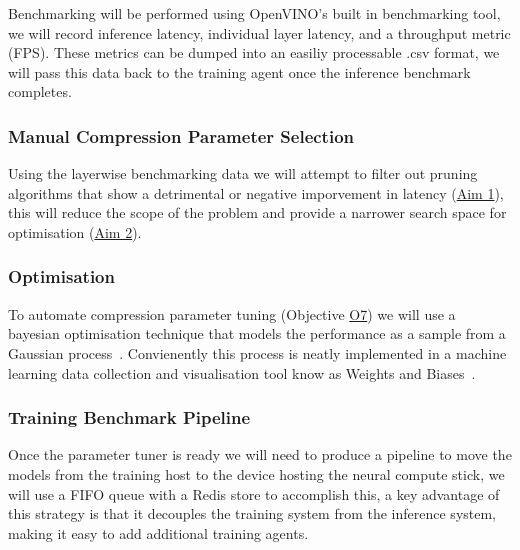 \documentclass[../D1.tex]{subfiles}
\begin{document}
Benchmarking will be performed using OpenVINO's built in benchmarking tool, we will record inference latency, individual layer latency, and a throughput metric (FPS). 
These metrics can be dumped into an easiliy processable .csv format, we will pass this data back to the training agent once the inference benchmark completes.


\subsubsection{Manual Compression Parameter Selection}
Using the layerwise benchmarking data we will attempt to filter out pruning algorithms that show a detrimental or negative imporvement in latency (\hyperref[Aim1]{Aim 1}), this will reduce the scope of the problem and provide a narrower search space for optimisation (\hyperref[Aim2]{Aim 2}).

\subsubsection{Optimisation}
To automate compression parameter tuning (Objective \hyperref[obj:CompPara]{O7}) we will use a bayesian optimisation technique that models the performance as a sample from a Gaussian process~\autocite{snoekPracticalBayesianOptimization2012}.
Convienently this process is neatly implemented in a machine learning data collection and visualisation tool know as Weights and Biases~\autocite{biewaldExperimentTrackingWeights}.

\subsubsection{Training Benchmark Pipeline}
Once the parameter tuner is ready we will need to produce a pipeline to move the models from the training host to the device hosting the neural compute stick, we will use a FIFO queue with a Redis store to accomplish this, a key advantage of this strategy is that it decouples the training system from the inference system, making it easy to add additional training agents. 
\end{document}
